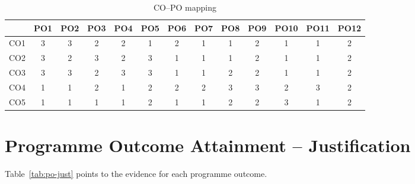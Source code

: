 \begin{table}[htbp]
\centering
\caption{CO--PO mapping}
\label{tab:copo}
\small
\setlength{\tabcolsep}{4pt}
\begin{tabular}{|l|c|c|c|c|c|c|c|c|c|c|c|c|}
\hline
 & \textbf{PO1} & \textbf{PO2} & \textbf{PO3} & \textbf{PO4} & \textbf{PO5} & \textbf{PO6} & \textbf{PO7} & \textbf{PO8} & \textbf{PO9} & \textbf{PO10} & \textbf{PO11} & \textbf{PO12} \\ \hline
CO1 & 3 & 3 & 2 & 2 & 1 & 2 & 1 & 1 & 2 & 1 & 1 & 2 \\ \hline
CO2 & 3 & 2 & 3 & 2 & 3 & 1 & 1 & 1 & 2 & 1 & 1 & 2 \\ \hline
CO3 & 3 & 3 & 2 & 3 & 3 & 1 & 1 & 2 & 2 & 1 & 1 & 2 \\ \hline
CO4 & 1 & 1 & 2 & 1 & 2 & 2 & 2 & 3 & 3 & 2 & 3 & 2 \\ \hline
CO5 & 1 & 1 & 1 & 1 & 2 & 1 & 1 & 2 & 2 & 3 & 1 & 2 \\ \hline
\end{tabular}
\end{table}

\section{Programme Outcome Attainment -- Justification}
Table~\ref{tab:po-just} points to the evidence for each programme outcome.

